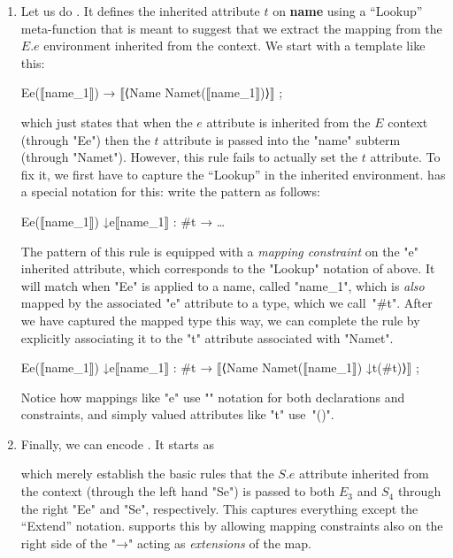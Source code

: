 \documentclass[11pt]{article} %
\begin{document}
\begin{enumerate}
\item Let us do . It defines the inherited attribute $t$ on \textbf{name} using a
  ``Lookup'' meta-function that is meant to suggest that we extract the mapping from the $E.e$
  environment inherited from the context. We start with a template like this:
\begin{hacs}
   Ee(⟦name_1⟧)  →  ⟦⟨Name Namet(⟦name_1⟧)⟩⟧ ;
\end{hacs}
  which just states that when the $e$ attribute is inherited from the $E$ context (through "Ee")
  then the $t$ attribute is passed into the "name" subterm (through "Namet"). However, this rule
  fails to actually set the $t$ attribute. To fix it, we first have to capture the ``Lookup'' in
  the inherited environment. \HAX has a special notation for this: write the pattern as follows:
\begin{hacs}
   Ee(⟦name_1⟧) ↓e{⟦name_1⟧ : #t}  →     …
\end{hacs}
  The pattern of this rule is equipped with a \emph{mapping constraint} on the "e" inherited
  attribute, which corresponds to the "Lookup" notation of  above. It will match when "Ee"
  is applied to a name, called "name_1", which is \emph{also} mapped by the associated "e" attribute
  to a type, which we call~"#t". After we have captured the mapped type this way, we can complete
  the rule by explicitly associating it to the "t" attribute associated with "Namet".
\begin{hacs}
   Ee(⟦name_1⟧) ↓e{⟦name_1⟧ : #t}  →     ⟦⟨Name Namet(⟦name_1⟧) ↓t(#t)⟩⟧ ;
\end{hacs}
  Notice how mappings like "e" use "{}" notation for both declarations and constraints, and simply
  valued attributes like "t" use~"()".

\item Finally, we can encode . It starts as
  which merely establish  the basic rules that the $S.e$ attribute inherited from the context (through
  the left hand "Se") is passed to both $E_3$ and $S_4$ through the right "Ee" and "Se",
  respectively. This captures everything except the ``Extend'' notation. \HAX supports this by
  allowing mapping constraints also on the right side of the "→" acting as \emph{extensions} of the
  map.

\end{enumerate}
\end{document}
